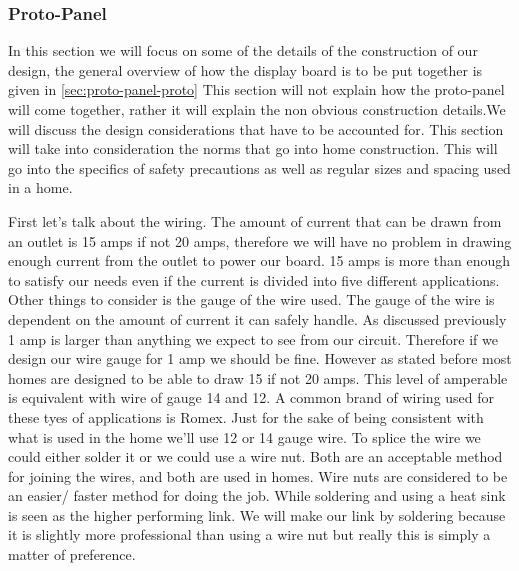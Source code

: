 \subsubsection{Proto-Panel}
\label{sec:proto-panel}
In this section we will focus on some of the details of the construction of our
design, the general overview of how the display board is to be put together is
given in \autoref{sec:proto-panel-proto} This section will not explain how the
proto{}-panel will come together, rather it will explain the non obvious
construction details.We will discuss the design considerations that have to be
accounted for. This section will take into consideration the norms that go into
home construction. This will go into the specifics of safety precautions as
well as regular sizes and spacing used in a home.

First let{}'s talk about the wiring. The amount of current that can be drawn
from an outlet is 15 amps if not 20 amps, therefore we will have no problem in
drawing enough current from the outlet to power our board. 15 amps is more than
enough to satisfy our needs even if the current is divided into five different
applications. Other things to consider is the gauge of the wire used. The gauge
of the wire is dependent on the amount of current it can safely handle. As
discussed previously 1 amp is larger than anything we expect to see from our
circuit. Therefore if we design our wire gauge for 1 amp we should be fine.
However as stated before most homes are designed to be able to draw 15 if not
20 amps. This level of amperable is equivalent with wire of gauge 14 and 12. A
common brand of wiring used for these tyes of applications is Romex. Just for
the sake of being consistent with what is used in the home we{}'ll use 12 or 14
gauge wire. To splice the wire we could either solder it or we could use a wire
nut. Both are an acceptable method for joining the wires, and both are used in
homes. Wire nuts are considered to be an easier/ faster method for doing the
job. While soldering and using a heat sink is seen as the higher performing
link. We will make our link by soldering because it is slightly more
professional than using a wire nut but really this is simply a matter of
preference.

